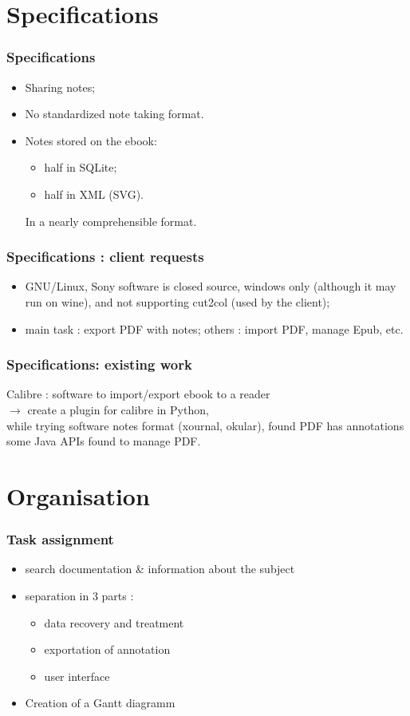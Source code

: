 \documentclass[t,12pt]{beamer}
\begin{document}
\section{Specifications}
\begin{frame}
  \frametitle{Specifications}
  \begin{itemize}
  \pause \item Sharing notes;
  \pause \item No standardized note taking format.
  \pause \item Notes stored on the ebook:
    \begin{itemize}
      \item half in SQLite;
      \item half in XML (SVG).
    \end{itemize}
  \pause In a nearly comprehensible format.
  \end{itemize}
\end{frame}

\begin{frame}
  \frametitle{Specifications : client requests}
  \begin{itemize}
    \item GNU/Linux,
    \pause Sony software is closed source, windows only (although
    it may run on wine), and not supporting cut2col (used by the
    client);
    \pause \item main task : export PDF with notes; \pause others :
    import PDF, manage Epub, etc.
  \end{itemize}
\end{frame}

\begin{frame}
  \frametitle{Specifications: existing work}
  Calibre : software to import/export ebook to a reader\\
  $\rightarrow$ create a plugin for calibre in Python,\\
  \pause while trying software notes format (xournal, okular),
  found PDF has annotations\\
  \pause some Java APIs found to manage PDF.
\end{frame}

\section{Organisation}
\begin{frame}
  \frametitle{Task assignment}
  \begin{itemize}
  	\item search documentation \& information about the subject
	\pause \item separation in 3 parts :
	\begin{itemize}
		\pause \item data recovery and treatment
		\item exportation of annotation
		\item user interface
	\end{itemize}
	\pause \item Creation of a Gantt diagramm
  \end{itemize}
\end{frame}
\end{document}
